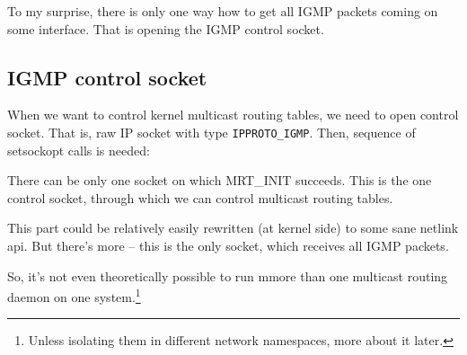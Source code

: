 To my surprise, there is only one way how to get all IGMP packets coming on
some interface. That is opening the IGMP control socket.

\subsection{IGMP control socket}

When we want to control kernel multicast routing tables, we need to open
control socket. That is, raw IP socket with type \texttt{IPPROTO\_IGMP}. Then,
sequence of setsockopt calls is needed:


There can be only one socket on which MRT\_INIT succeeds. This is the one
control socket, through which we can control multicast routing tables.

This part could be relatively easily rewritten (at kernel side) to some sane
netlink api. But there's more -- this is the only socket, which receives all
IGMP packets.

So, it's not even theoretically possible to run mmore than one multicast
routing daemon on one system.\footnote{Unless isolating them in different
network namespaces, more about it later.}
